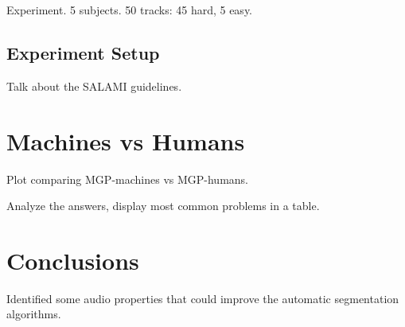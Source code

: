 \documentclass{article}
\begin{document}
Experiment. 5 subjects. 50 tracks: 45 hard, 5 easy.

\subsection{Experiment Setup}

Talk about the SALAMI guidelines.

\section{Machines vs Humans}

Plot comparing MGP-machines vs MGP-humans.

Analyze the answers, display most common problems in a table.



\section{Conclusions}

Identified some audio properties that could improve the automatic segmentation algorithms.








\end{document}
